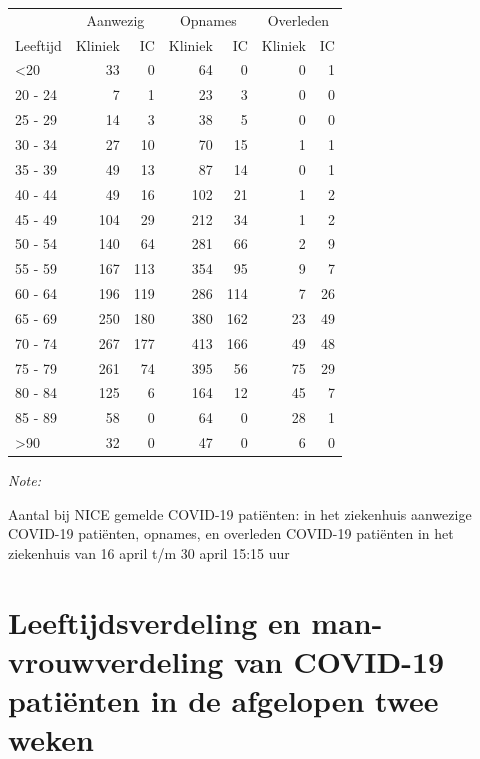 \documentclass[
  english,
  man,floatsintext]{apa6}
\begin{document}
\begin{table}
\centering\begingroup\fontsize{10}{12}\selectfont

\begin{threeparttable}
\begin{tabular}{lrrrrrr}
\toprule
\multicolumn{1}{c}{ } & \multicolumn{2}{c}{Aanwezig} & \multicolumn{2}{c}{Opnames} & \multicolumn{2}{c}{Overleden} \\
\cmidrule(l{3pt}r{3pt}){2-3} \cmidrule(l{3pt}r{3pt}){4-5} \cmidrule(l{3pt}r{3pt}){6-7}
Leeftijd & Kliniek & IC & Kliniek & IC & Kliniek & IC\\
\midrule
<20 & 33 & 0 & 64 & 0 & 0 & 1\\
20 - 24 & 7 & 1 & 23 & 3 & 0 & 0\\
25 - 29 & 14 & 3 & 38 & 5 & 0 & 0\\
30 - 34 & 27 & 10 & 70 & 15 & 1 & 1\\
35 - 39 & 49 & 13 & 87 & 14 & 0 & 1\\
40 - 44 & 49 & 16 & 102 & 21 & 1 & 2\\
45 - 49 & 104 & 29 & 212 & 34 & 1 & 2\\
50 - 54 & 140 & 64 & 281 & 66 & 2 & 9\\
55 - 59 & 167 & 113 & 354 & 95 & 9 & 7\\
60 - 64 & 196 & 119 & 286 & 114 & 7 & 26\\
65 - 69 & 250 & 180 & 380 & 162 & 23 & 49\\
70 - 74 & 267 & 177 & 413 & 166 & 49 & 48\\
75 - 79 & 261 & 74 & 395 & 56 & 75 & 29\\
80 - 84 & 125 & 6 & 164 & 12 & 45 & 7\\
85 - 89 & 58 & 0 & 64 & 0 & 28 & 1\\
>90 & 32 & 0 & 47 & 0 & 6 & 0\\
\bottomrule
\end{tabular}
\begin{tablenotes}
\item \textit{Note: } 
\item Aantal bij NICE gemelde COVID-19 patiënten: in het ziekenhuis aanwezige COVID-19 patiënten, opnames, en overleden COVID-19 patiënten in het ziekenhuis van 16 april t/m 30 april 15:15 uur
\end{tablenotes}
\end{threeparttable}
\endgroup{}
\end{table}

\newpage

\hypertarget{leeftijdsverdeling-en-man-vrouwverdeling-van-covid-19-patiuxebnten-in-de-afgelopen-twee-weken}{%
\section{Leeftijdsverdeling en man-vrouwverdeling van COVID-19 patiënten in de afgelopen twee weken}\label{leeftijdsverdeling-en-man-vrouwverdeling-van-covid-19-patiuxebnten-in-de-afgelopen-twee-weken}}
\end{document}
